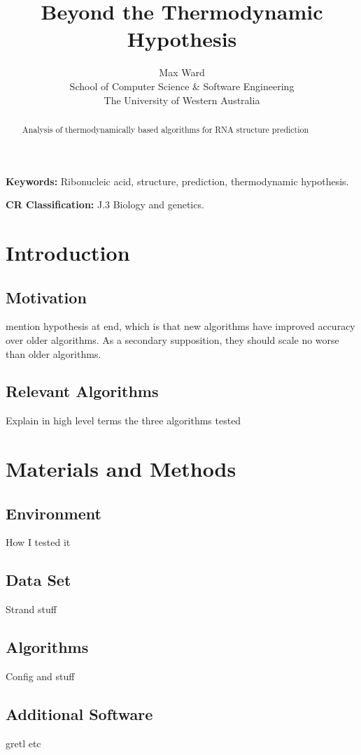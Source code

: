 \documentclass[12pt, a4paper]{article}
\title{Beyond the Thermodynamic Hypothesis}
\author{Max Ward \\
School of Computer Science \& Software Engineering \\
The University of Western Australia}
\begin{document}
\maketitle

\begin{abstract}
Analysis of thermodynamically based algorithms for RNA structure prediction
\end{abstract}


{\bf Keywords:} Ribonucleic acid, structure, prediction, thermodynamic hypothesis.

{\bf CR Classification:} J.3 Biology and genetics.

\clearpage

\tableofcontents
\listoffigures
\clearpage

\section{Introduction}
\subsection{Motivation}
mention hypothesis at end, which is that new algorithms have improved accuracy over older algorithms. As a secondary supposition, they should scale no worse than older algorithms.
\subsection{Relevant Algorithms}
Explain in high level terms the three algorithms tested

\section{Materials and Methods}
\subsection{Environment}
How I tested it
\subsection{Data Set}
Strand stuff
\subsection{Algorithms}
Config and stuff
\subsection{Additional Software}
gretl etc
\end{document}
